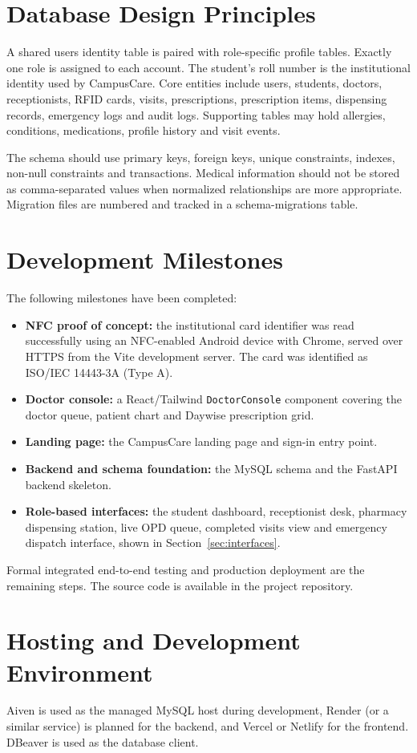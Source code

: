 \documentclass[a4paper,oneside,openany]{tietreport}
\begin{document}
\section{Database Design Principles}
A shared users identity table is paired with role-specific profile tables. Exactly one role is assigned to each account. The student's roll number is the institutional identity used by CampusCare. Core entities include users, students, doctors, receptionists, RFID cards, visits, prescriptions, prescription items, dispensing records, emergency logs and audit logs. Supporting tables may hold allergies, conditions, medications, profile history and visit events.

The schema should use primary keys, foreign keys, unique constraints, indexes, non-null constraints and transactions. Medical information should not be stored as comma-separated values when normalized relationships are more appropriate. Migration files are numbered and tracked in a schema-migrations table.

\section{Development Milestones}
The following milestones have been completed:
\begin{itemize}
\item \textbf{NFC proof of concept:} the institutional card identifier was read successfully using an NFC-enabled Android device with Chrome, served over HTTPS from the Vite development server. The card was identified as ISO/IEC 14443-3A (Type A).
\item \textbf{Doctor console:} a React/Tailwind \texttt{DoctorConsole} component covering the doctor queue, patient chart and Daywise prescription grid.
\item \textbf{Landing page:} the CampusCare landing page and sign-in entry point.
\item \textbf{Backend and schema foundation:} the MySQL schema and the FastAPI backend skeleton.
\item \textbf{Role-based interfaces:} the student dashboard, receptionist desk, pharmacy dispensing station, live OPD queue, completed visits view and emergency dispatch interface, shown in Section~\ref{sec:interfaces}.
\end{itemize}
Formal integrated end-to-end testing and production deployment are the remaining steps. The source code is available in the project repository.

\section{Hosting and Development Environment}
Aiven is used as the managed MySQL host during development, Render (or a similar service) is planned for the backend, and Vercel or Netlify for the frontend. DBeaver is used as the database client.
\end{document}

